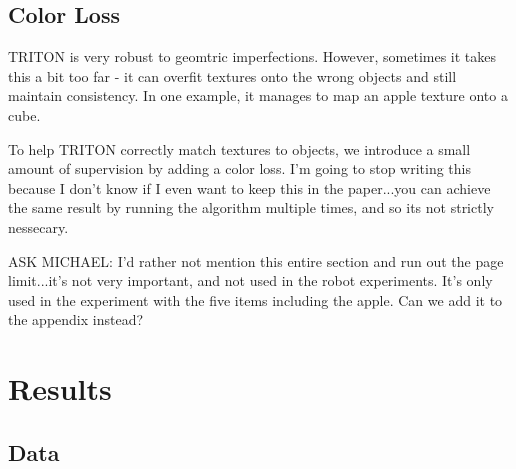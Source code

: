 \documentclass{article}
\begin{document}

% 
% 
% 
% 

\subsection{Color Loss}

TRITON is very robust to geomtric imperfections. However, sometimes it takes this a bit too far - it can overfit textures onto the wrong objects and still maintain consistency.
In one example, it manages to map an apple texture onto a cube. 

To help TRITON correctly match textures to objects, we introduce a small amount of supervision by adding a color loss. I'm going to stop writing this because I don't know if I even want to keep this in the paper...you can achieve the same result by running the algorithm multiple times, and so its not strictly nessecary.

ASK MICHAEL: I'd rather not mention this entire section and run out the page limit...it's not very important, and not used in the robot experiments. It's only used in the experiment with the five items including the apple. Can we add it to the appendix instead?



\section{Results}

\subsection{Data}
\end{document}
